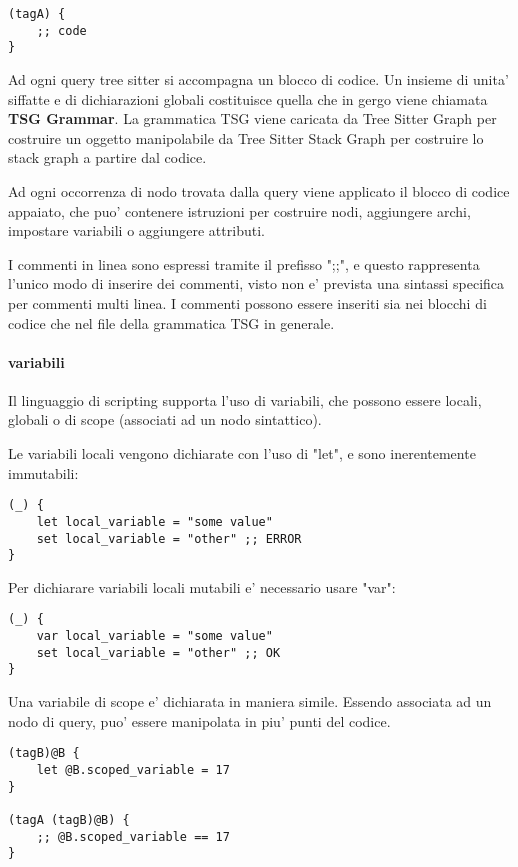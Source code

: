 \begin{verbatim}
(tagA) {
    ;; code
}
\end{verbatim}

Ad ogni query tree sitter si accompagna un blocco di codice.
Un insieme di unita' siffatte e di dichiarazioni globali costituisce quella che in gergo viene chiamata \textbf{TSG Grammar}. La grammatica TSG viene caricata da Tree Sitter Graph per costruire un oggetto manipolabile da Tree Sitter Stack Graph per costruire lo stack graph a partire dal codice.

Ad ogni occorrenza di nodo trovata dalla query viene applicato il blocco di codice appaiato, che puo' contenere istruzioni per costruire nodi, aggiungere archi, impostare variabili o aggiungere attributi.

I commenti in linea sono espressi tramite il prefisso ";;", e questo rappresenta l'unico modo di inserire dei commenti, visto non e' prevista una sintassi specifica per commenti multi linea.
I commenti possono essere inseriti sia nei blocchi di codice che nel file della grammatica TSG in generale.

\paragraph{variabili}
Il linguaggio di scripting supporta l'uso di variabili, che possono essere locali, globali o di scope (associati ad un nodo sintattico).

Le variabili locali vengono dichiarate con l'uso di "let", e sono inerentemente immutabili:

\begin{verbatim}
(_) {
    let local_variable = "some value"
    set local_variable = "other" ;; ERROR
}
\end{verbatim}

Per dichiarare variabili locali mutabili e' necessario usare "var":

\begin{verbatim}
(_) {
    var local_variable = "some value"
    set local_variable = "other" ;; OK
}
\end{verbatim}

Una variabile di scope e' dichiarata in maniera simile. Essendo associata ad un nodo di query, puo' essere manipolata in piu' punti del codice.

\begin{verbatim}
(tagB)@B {
    let @B.scoped_variable = 17
}

(tagA (tagB)@B) {
    ;; @B.scoped_variable == 17
}
\end{verbatim}

